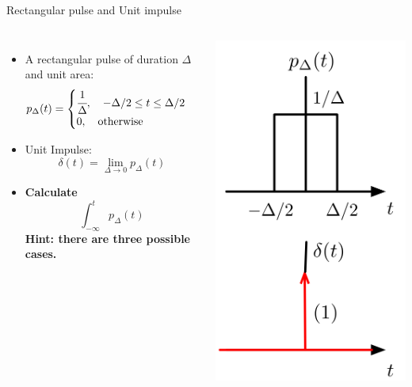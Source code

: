 \documentclass[aspectratio=169,xcolor=dvipsnames,svgnames,x11names,fleqn]{beamer}
\begin{document}
\begin{frame}{Rectangular pulse and Unit impulse}

\begin{columns}
    \begin{itemize}
        \item  A rectangular pulse of duration $\Delta$ and unit area:
        \begin{equation*}
            \begin{aligned}
                p_\Delta(t)= \begin{cases}
                    \cfrac{1}{\Delta},\quad -\Delta/2 \leq t \leq \Delta/2\\
                    0, \quad \textrm{otherwise}
                \end{cases}
            \end{aligned}
        \end{equation*}
        \item Unit Impulse:
        \begin{equation*}
            \delta(t) = \lim_{\Delta \to 0}p_\Delta (t)
        \end{equation*}
        \item \bf \color{red} Calculate 
        $$
        \int_{ -\infty}^{t}   p_\Delta(t) 
        $$
        Hint: there are three possible cases.
    \end{itemize}
\includegraphics[width=0.7\linewidth,trim=0 0 0 0cm,clip]{figures/unitpulse.png}
\end{columns}
\end{frame}
\end{document}
